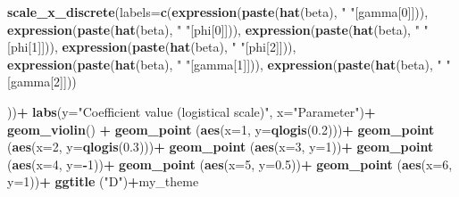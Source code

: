 \documentclass[
]{article}
\newenvironment{Shaded}{\begin{snugshade}}{\end{snugshade}}
\newcommand{\AttributeTok}[1]{\textcolor[rgb]{0.13,0.29,0.53}{#1}}
\newcommand{\DecValTok}[1]{\textcolor[rgb]{0.00,0.00,0.81}{#1}}
\newcommand{\FloatTok}[1]{\textcolor[rgb]{0.00,0.00,0.81}{#1}}
\newcommand{\FunctionTok}[1]{\textcolor[rgb]{0.13,0.29,0.53}{\textbf{#1}}}
\newcommand{\NormalTok}[1]{#1}
\newcommand{\SpecialCharTok}[1]{\textcolor[rgb]{0.81,0.36,0.00}{\textbf{#1}}}
\newcommand{\StringTok}[1]{\textcolor[rgb]{0.31,0.60,0.02}{#1}}
\begin{document}
{\begin{Shaded}
\begin{Highlighting}[]
  \FunctionTok{scale\_x\_discrete}\NormalTok{(}\AttributeTok{labels=}\FunctionTok{c}\NormalTok{(}\FunctionTok{expression}\NormalTok{(}\FunctionTok{paste}\NormalTok{(}\FunctionTok{hat}\NormalTok{(beta), }\StringTok{" "}\NormalTok{[gamma[}\DecValTok{0}\NormalTok{]])),}
                            \FunctionTok{expression}\NormalTok{(}\FunctionTok{paste}\NormalTok{(}\FunctionTok{hat}\NormalTok{(beta), }\StringTok{" "}\NormalTok{[phi[}\DecValTok{0}\NormalTok{]])),}
                            \FunctionTok{expression}\NormalTok{(}\FunctionTok{paste}\NormalTok{(}\FunctionTok{hat}\NormalTok{(beta), }\StringTok{" "}\NormalTok{[phi[}\DecValTok{1}\NormalTok{]])),}
                            \FunctionTok{expression}\NormalTok{(}\FunctionTok{paste}\NormalTok{(}\FunctionTok{hat}\NormalTok{(beta), }\StringTok{" "}\NormalTok{[phi[}\DecValTok{2}\NormalTok{]])),}
                            \FunctionTok{expression}\NormalTok{(}\FunctionTok{paste}\NormalTok{(}\FunctionTok{hat}\NormalTok{(beta), }\StringTok{" "}\NormalTok{[gamma[}\DecValTok{1}\NormalTok{]])),}
                            \FunctionTok{expression}\NormalTok{(}\FunctionTok{paste}\NormalTok{(}\FunctionTok{hat}\NormalTok{(beta), }\StringTok{" "}\NormalTok{[gamma[}\DecValTok{2}\NormalTok{]]))}
                            
                            
\NormalTok{                            ))}\SpecialCharTok{+}
  \FunctionTok{labs}\NormalTok{(}\AttributeTok{y=}\StringTok{"Coefficient value (logistical scale)"}\NormalTok{, }\AttributeTok{x=}\StringTok{"Parameter"}\NormalTok{)}\SpecialCharTok{+}
  \FunctionTok{geom\_violin}\NormalTok{() }\SpecialCharTok{+}
  \FunctionTok{geom\_point}\NormalTok{ (}\FunctionTok{aes}\NormalTok{(}\AttributeTok{x=}\DecValTok{1}\NormalTok{, }\AttributeTok{y=}\FunctionTok{qlogis}\NormalTok{(}\FloatTok{0.2}\NormalTok{)))}\SpecialCharTok{+}
  \FunctionTok{geom\_point}\NormalTok{ (}\FunctionTok{aes}\NormalTok{(}\AttributeTok{x=}\DecValTok{2}\NormalTok{, }\AttributeTok{y=}\FunctionTok{qlogis}\NormalTok{(}\FloatTok{0.3}\NormalTok{)))}\SpecialCharTok{+}
  \FunctionTok{geom\_point}\NormalTok{ (}\FunctionTok{aes}\NormalTok{(}\AttributeTok{x=}\DecValTok{3}\NormalTok{, }\AttributeTok{y=}\DecValTok{1}\NormalTok{))}\SpecialCharTok{+}
  \FunctionTok{geom\_point}\NormalTok{ (}\FunctionTok{aes}\NormalTok{(}\AttributeTok{x=}\DecValTok{4}\NormalTok{, }\AttributeTok{y=}\SpecialCharTok{{-}}\DecValTok{1}\NormalTok{))}\SpecialCharTok{+}
  \FunctionTok{geom\_point}\NormalTok{ (}\FunctionTok{aes}\NormalTok{(}\AttributeTok{x=}\DecValTok{5}\NormalTok{, }\AttributeTok{y=}\FloatTok{0.5}\NormalTok{))}\SpecialCharTok{+}
  \FunctionTok{geom\_point}\NormalTok{ (}\FunctionTok{aes}\NormalTok{(}\AttributeTok{x=}\DecValTok{6}\NormalTok{, }\AttributeTok{y=}\DecValTok{1}\NormalTok{))}\SpecialCharTok{+}
  \FunctionTok{ggtitle}\NormalTok{ (}\StringTok{"D"}\NormalTok{)}\SpecialCharTok{+}\NormalTok{my\_theme}


\end{Highlighting}
\end{Shaded}}
\end{document}
